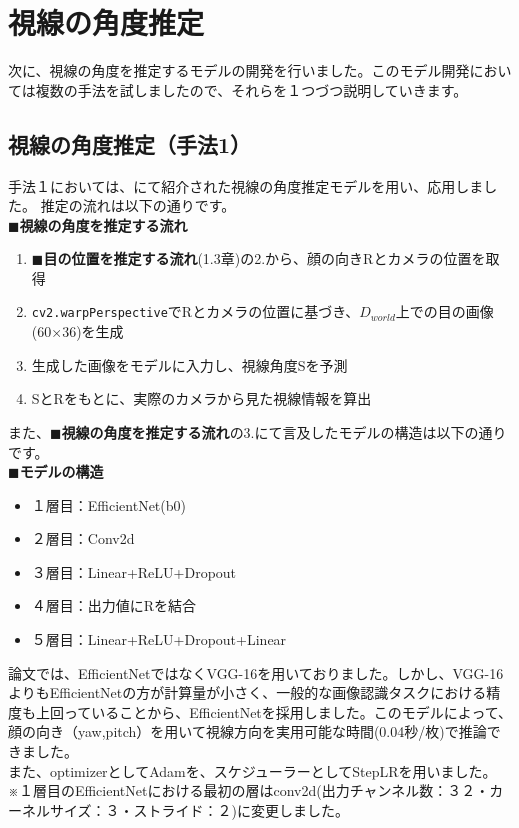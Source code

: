 \section{視線の角度推定}
次に、視線の角度を推定するモデルの開発を行いました。このモデル開発においては複数の手法を試しましたので、それらを１つづつ説明していきます。

\subsection{視線の角度推定（手法1）}
手法１においては、\cite{zhang2017mpiigaze}にて紹介された視線の角度推定モデルを用い、応用しました。
推定の流れは以下の通りです。\\
$\blacksquare$\textbf{視線の角度を推定する流れ}
\begin{enumerate}
    \item $\blacksquare$\textbf{目の位置を推定する流れ}(1.3章)の2.から、顔の向きRとカメラの位置を取得
    \item \texttt{cv2.warpPerspective}でRとカメラの位置に基づき、$D_{world}$上での目の画像(60×36)を生成
    \item 生成した画像をモデルに入力し、視線角度Sを予測
    \item SとRをもとに、実際のカメラから見た視線情報を算出
\end{enumerate}
また、$\blacksquare$\textbf{視線の角度を推定する流れ}の3.にて言及したモデルの構造は以下の通りです。\\
$\blacksquare$\textbf{モデルの構造}
\begin{itemize}
    \item １層目：EfficientNet(b0)
    \item ２層目：Conv2d
    \item ３層目：Linear+ReLU+Dropout
    \item ４層目：出力値にRを結合
    \item ５層目：Linear+ReLU+Dropout+Linear
\end{itemize}
論文\cite{zhang2017mpiigaze}では、EfficientNetではなくVGG-16を用いておりました。しかし、VGG-16よりもEfficientNetの方が計算量が小さく、一般的な画像認識タスクにおける精度も上回っていることから、EfficientNetを採用しました。このモデルによって、顔の向き（yaw,pitch）を用いて視線方向を実用可能な時間(0.04秒/枚)で推論できました。\\
また、optimizerとしてAdamを、スケジューラーとしてStepLRを用いました。\\
※１層目のEfficientNetにおける最初の層はconv2d(出力チャンネル数：３２・カーネルサイズ：３・ストライド：２)に変更しました。\\

